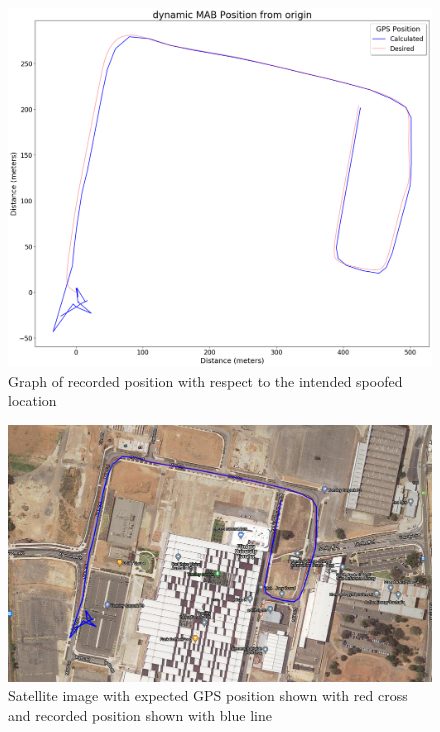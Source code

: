 \begin{figure}[h]
    \begin{centering}
        \includegraphics[width=14cm,keepaspectratio]{Figures/2021_3_30_dynamic_MAB Position from origin.png}
        \caption{Graph of recorded position with respect to the intended spoofed location}
        \label{fig:MABdynamicPosition}
    \end{centering}
\end{figure}

\begin{figure}[h]
    \begin{centering}
        \includegraphics[width=14cm,keepaspectratio]{Figures/2021_3_30_dynamic_MAB_Satellite.PNG}
        \caption{Satellite image with expected GPS position shown with red cross and recorded position shown with blue line}
        \label{fig:MABdynamicSatelliteImage}
    \end{centering}
\end{figure}


